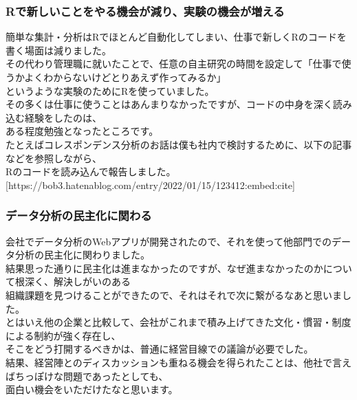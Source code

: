 \documentclass[
  letterpaper,
  DIV=11,
  numbers=noendperiod]{scrartcl}
\begin{document}
\hypertarget{rux3067ux65b0ux3057ux3044ux3053ux3068ux3092ux3084ux308bux6a5fux4f1aux304cux6e1bux308aux5b9fux9a13ux306eux6a5fux4f1aux304cux5897ux3048ux308b}{%
\subsubsection{Rで新しいことをやる機会が減り、実験の機会が増える}\label{rux3067ux65b0ux3057ux3044ux3053ux3068ux3092ux3084ux308bux6a5fux4f1aux304cux6e1bux308aux5b9fux9a13ux306eux6a5fux4f1aux304cux5897ux3048ux308b}}

簡単な集計・分析はRでほとんど自動化してしまい、仕事で新しくRのコードを書く場面は減りました。\\
その代わり管理職に就いたことで、任意の自主研究の時間を設定して「仕事で使うかよくわからないけどとりあえず作ってみるか」\\
というような実験のためにRを使っていました。\\
その多くは仕事に使うことはあんまりなかったですが、コードの中身を深く読み込む経験をしたのは、\\
ある程度勉強となったところです。\\
たとえばコレスポンデンス分析のお話は僕も社内で検討するために、以下の記事などを参照しながら、\\
Rのコードを読み込んで報告しました。\\
{[}https://bob3.hatenablog.com/entry/2022/01/15/123412:embed:cite{]}

\hypertarget{ux30c7ux30fcux30bfux5206ux6790ux306eux6c11ux4e3bux5316ux306bux95a2ux308fux308b}{%
\subsubsection{データ分析の民主化に関わる}\label{ux30c7ux30fcux30bfux5206ux6790ux306eux6c11ux4e3bux5316ux306bux95a2ux308fux308b}}

会社でデータ分析のWebアプリが開発されたので、それを使って他部門でのデータ分析の民主化に関わりました。\\
結果思った通りに民主化は進まなかったのですが、なぜ進まなかったのかについて根深く、解決しがいのある\\
組織課題を見つけることができたので、それはそれで次に繋がるなあと思いました。\\
とはいえ他の企業と比較して、会社がこれまで積み上げてきた文化・慣習・制度による制約が強く存在し、\\
そこをどう打開するべきかは、普通に経営目線での議論が必要でした。\\
結果、経営陣とのディスカッションも重ねる機会を得られたことは、他社で言えばちっぽけな問題であったとしても、\\
面白い機会をいただけたなと思います。
\end{document}
